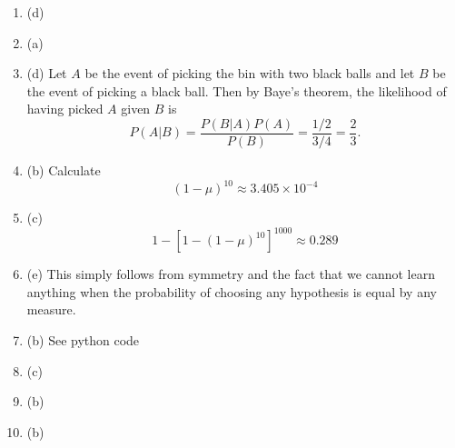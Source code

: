 \documentclass[12pt]{article}
\begin{document}
\begin{enumerate}[leftmargin=*]
\item (d)
\item (a)
\item (d) Let $A$ be the event of picking the bin with two black balls and let $B$ be the event of picking a black ball. Then by Baye's theorem, the likelihood of having picked $A$ given $B$ is
\[ P(A | B) = \frac{P(B | A) P(A)}{P(B)} = \frac{1/2}{3/4} = \frac{2}{3}. \]
\item (b) Calculate
\[ (1 - \mu)^{10} \approx 3.405 \times 10^{-4}\]
\item (c)
\[ 1 - [1 - (1 - \mu)^{10}]^{1000} \approx 0.289 \]
\item (e) This simply follows from symmetry and the fact that we cannot learn anything when the probability of choosing any hypothesis is equal by any measure.
\item (b) See python code
\item (c)
\item (b)
\item (b)
\end{enumerate}
\end{document}
